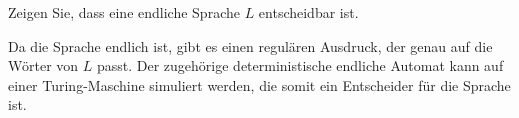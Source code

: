 Zeigen Sie, dass eine endliche Sprache $L$ entscheidbar ist.

\begin{loesung}
Da die Sprache endlich ist, gibt es einen regulären Ausdruck,
der genau auf die Wörter von $L$ passt. Der zugehörige deterministische
endliche Automat kann auf einer Turing-Maschine simuliert werden,
die somit ein Entscheider für die Sprache ist.
\end{loesung}

